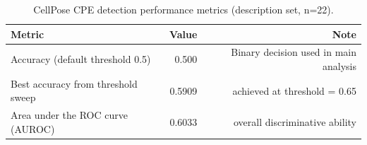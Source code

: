 \begin{table}[htbp]
\centering
\small
\caption{CellPose CPE detection performance metrics (description set, n=22).}
\label{tab:cellpose-performance}

\begin{tabular}{lrr}
\toprule
\textbf{Metric} & \textbf{Value} & \textbf{Note} \\
\midrule
Accuracy (default threshold 0.5) & 0.500 & Binary decision used in main analysis \\
Best accuracy from threshold sweep & 0.5909 & achieved at threshold = 0.65 \\
Area under the ROC curve (AUROC) & 0.6033 & overall discriminative ability \\
\bottomrule
\end{tabular}

\end{table}